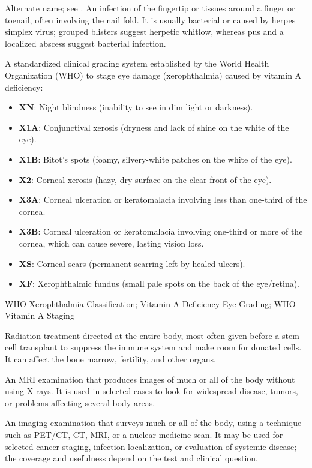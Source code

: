  Alternate name; see .
 An infection of the fingertip or tissues around a finger or toenail, often involving the nail fold. It is usually bacterial or caused by herpes simplex virus; grouped blisters suggest herpetic whitlow, whereas pus and a localized abscess suggest bacterial infection.


 A standardized clinical grading system established by the World Health Organization (WHO) to stage eye damage (xerophthalmia) caused by vitamin A deficiency:
\begin{itemize}
  \item \textbf{XN}: Night blindness (inability to see in dim light or darkness).
  \item \textbf{X1A}: Conjunctival xerosis (dryness and lack of shine on the white of the eye).
  \item \textbf{X1B}: Bitot's spots (foamy, silvery-white patches on the white of the eye).
  \item \textbf{X2}: Corneal xerosis (hazy, dry surface on the clear front of the eye).
  \item \textbf{X3A}: Corneal ulceration or keratomalacia involving less than one-third of the cornea.
  \item \textbf{X3B}: Corneal ulceration or keratomalacia involving one-third or more of the cornea, which can cause severe, lasting vision loss.
  \item \textbf{XS}: Corneal scars (permanent scarring left by healed ulcers).
  \item \textbf{XF}: Xerophthalmic fundus (small pale spots on the back of the eye/retina).
\end{itemize}

\synonyms
WHO Xerophthalmia Classification; Vitamin A Deficiency Eye Grading; WHO Vitamin A Staging

 Radiation treatment directed at the entire body, most often given before a stem-cell transplant to suppress the immune system and make room for donated cells. It can affect the bone marrow, fertility, and other organs.

 An MRI examination that produces images of much or all of the body without using X-rays. It is used in selected cases to look for widespread disease, tumors, or problems affecting several body areas.

 An imaging examination that surveys much or all of the body, using a technique such as PET/CT, CT, MRI, or a nuclear medicine scan. It may be used for selected cancer staging, infection localization, or evaluation of systemic disease; the coverage and usefulness depend on the test and clinical question.

